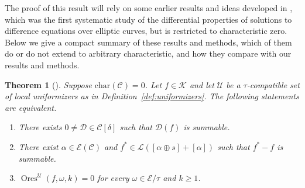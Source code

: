 \documentclass[preprint,12pt]{elsarticle}
\numberwithin{equation}{section} %
\theoremstyle{theorem}
\newtheorem{theorem}{Theorem}[section]
\theoremstyle{definition}
\newcommand{\Ca}{\mathcal{C}} %
\newcommand{\bk}{\mathcal{K}} %
\newcommand{\ec}{\mathcal{E}} %
\newcommand{\orbita}{{\ec/\tau}} %
\DeclareMathOperator{\ores}{Ores}
\begin{document}
The proof of this result will rely on some earlier results and ideas developed in \cite[Appendix~B]{Dreyfus2018}, which was the first systematic study of the differential properties of solutions to difference equations over elliptic curves, but is restricted to characteristic zero. Below we give a compact summary of these results and methods, which of them do or do not extend to arbitrary characteristic, and how they compare with our results and methods.

\begin{theorem}[]\label{thm:dhrs-additive}
    Suppose $\mathrm{char}(\Ca)=0$. Let $f\in\bk$ and let $\mathcal{U}$ be a $\tau$-compatible set of local uniformizers as in Definition~\ref{def:uniformizers}. The following statements are equivalent.
    \begin{enumerate}
        \item There exists $0\neq \mathcal{D}\in\Ca[\delta]$ such that $\mathcal{D}(f)$ is summable.
        \item There exist $\alpha\in\ec(\Ca)$ and $f^*\in\mathcal{L}([\alpha\oplus s]+[\alpha])$ such that $f^*-f$ is summable.
        \item $\ores^\mathcal{U}(f,\omega,k)=0$ for every $\omega\in\orbita$ and $k\geq 1$.
    \end{enumerate}
\end{theorem}
\end{document}

